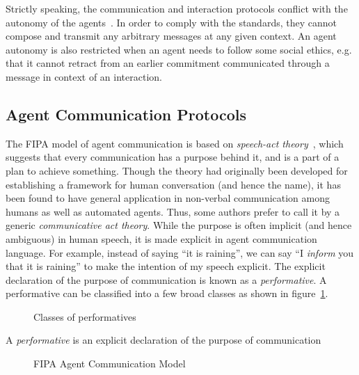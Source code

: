 Strictly speaking, the communication and interaction protocols conflict with the autonomy of the agents~\citep{Chopra:2013}. 
In order to comply with the standards, they cannot compose and transmit any arbitrary messages at any given context. An agent 
autonomy is also restricted when an agent needs to follow some social ethics, e.g. that it cannot retract from an earlier 
commitment communicated through a message in context of an interaction.

\subsection{Agent Communication Protocols}

  
 
The FIPA model of agent communication is based on {\em speech-act theory}~\citep{Austin:1975}, which suggests that every 
communication has a purpose behind it, and is a part of a plan to achieve something. Though the theory had originally been 
developed for establishing a framework for human conversation (and hence the name), it has been found to have general 
application in non-verbal communication among humans as well as automated agents. Thus, some authors prefer to call it by 
a generic {\em communicative act theory}. While the 
purpose is often implicit (and hence ambiguous) in human speech, it is made explicit in agent communication language. For example,
instead of saying ``it is raining'', we can say ``I {\it inform} you that it is raining'' to make the intention of my speech
explicit. The explicit declaration of the purpose of communication is known as a {\em performative}. A performative can be 
classified into a few broad classes as shown in figure~\ref{fig:agents:performatives}. 

\begin{figure}[!htbp]
	\centering
	\caption{Classes of performatives}
	\label{fig:agents:performatives}
\end{figure}

\begin{definition} [performative]
	A {\em performative} is an explicit declaration of the purpose of communication 
\end{definition}

\begin{figure}[!htbp]
	\centering
	\caption{FIPA Agent Communication Model}
	\label{fig:agents:comm-model}
\end{figure}

